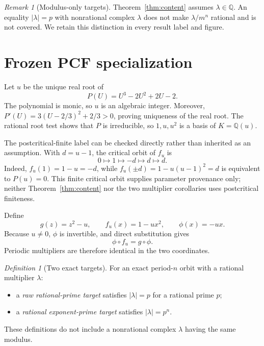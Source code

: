\documentclass[11pt]{article}
\theoremstyle{remark}
\newtheorem{remark}[theorem]{Remark}
\newtheorem{definition}[theorem]{Definition}
\begin{document}
\begin{remark}[Modulus-only targets]
Theorem~\ref{thm:content} assumes \(\lambda\in\mathbb Q\).  An equality
\(|\lambda|=p\) with nonrational complex \(\lambda\) does not make
\(\lambda/m^n\) rational and is not covered.  We retain this distinction in
every result label and figure.
\end{remark}

\section{Frozen PCF specialization}
\label{sec:frozen}

Let \(u\) be the unique real root of
\begin{equation}
 P(U)=U^3-2U^2+2U-2.
 \label{eq:parameter-polynomial}
\end{equation}
The polynomial is monic, so \(u\) is an algebraic integer.  Moreover,
\(P'(U)=3(U-2/3)^2+2/3>0\), proving uniqueness of the real root.  The rational
root test shows that \(P\) is irreducible, so \(1,u,u^2\) is a basis of
\(K=\mathbb Q(u)\).

The postcritical-finite label can be checked directly rather than inherited
as an assumption.  With \(d=u-1\), the critical orbit of \(f_u\) is
\begin{equation}
 0\longmapsto 1\longmapsto -d\longmapsto d\longmapsto d.
 \label{eq:critical-orbit}
\end{equation}
Indeed, \(f_u(1)=1-u=-d\), while
\(f_u(\pm d)=1-u(u-1)^2=d\) is equivalent to
\(P(u)=0\).  This finite critical orbit supplies parameter provenance only;
neither Theorem~\ref{thm:content} nor the two multiplier corollaries uses
postcritical finiteness.

Define
\begin{equation}
 g(z)=z^2-u,\qquad f_u(x)=1-ux^2,\qquad \phi(x)=-ux.
 \label{eq:maps}
\end{equation}
Because \(u\ne0\), \(\phi\) is invertible, and direct substitution gives
\begin{equation}
 \phi\circ f_u=g\circ\phi.
 \label{eq:conjugacy}
\end{equation}
Periodic multipliers are therefore identical in the two coordinates.

\begin{definition}[Two exact targets]
For an exact period-\(n\) orbit with a rational multiplier \(\lambda\):
\begin{itemize}
\item a \emph{raw rational-prime target} satisfies \(|\lambda|=p\) for a
rational prime \(p\);
\item a \emph{rational exponent-prime target} satisfies
\(|\lambda|=p^n\).
\end{itemize}
These definitions do not include a nonrational complex \(\lambda\) having the
same modulus.
\end{definition}
\end{document}
